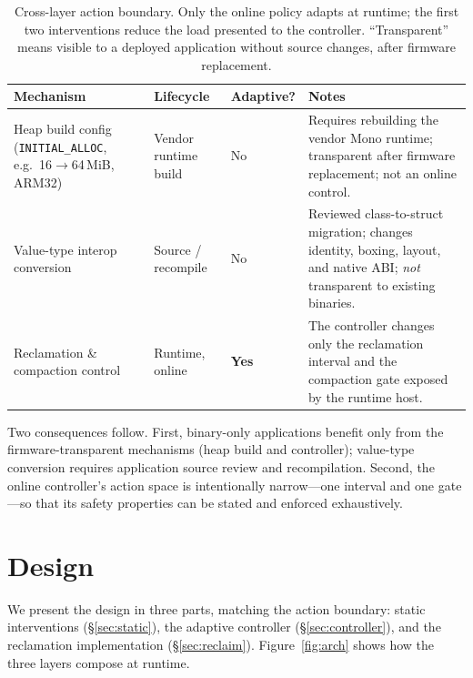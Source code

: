 \documentclass[acmsmall,screen]{acmart}
\begin{document}
\begin{table}[t]
  \caption{Cross-layer action boundary. Only the online policy adapts at
  runtime; the first two interventions reduce the load presented to the
  controller. ``Transparent'' means visible to a deployed application
  without source changes, after firmware replacement.}
  \label{tab:boundary}
  \small
  \begin{tabular}{@{}p{3.1cm}p{2.4cm}p{1.7cm}p{4.4cm}@{}}
    \toprule
    \textbf{Mechanism} & \textbf{Lifecycle} & \textbf{Adaptive?} &
    \textbf{Notes} \\
    \midrule
    Heap build config
    (\texttt{INITIAL\_ALLOC}, e.g.\ 16$\to$64\,MiB, ARM32) &
    Vendor runtime build & No &
    Requires rebuilding the vendor Mono runtime; transparent after firmware
    replacement; not an online control. \\
    Value-type interop conversion &
    Source / recompile & No &
    Reviewed class-to-struct migration; changes identity, boxing, layout,
    and native ABI; \emph{not} transparent to existing binaries. \\
    Reclamation \& compaction control &
    Runtime, online & \textbf{Yes} &
    The controller changes only the reclamation interval and the compaction
    gate exposed by the runtime host. \\
    \bottomrule
  \end{tabular}
\end{table}

Two consequences follow. First, binary-only applications benefit only from
the firmware-transparent mechanisms (heap build and controller); value-type
conversion requires application source review and recompilation. Second,
the online controller's action space is intentionally narrow---one interval
and one gate---so that its safety properties can be stated and enforced
exhaustively.

\section{Design}
\label{sec:design}

We present the design in three parts, matching the action boundary:
static interventions (\S\ref{sec:static}), the adaptive controller
(\S\ref{sec:controller}), and the reclamation implementation
(\S\ref{sec:reclaim}). Figure~\ref{fig:arch} shows how the three layers
compose at runtime.
\end{document}
